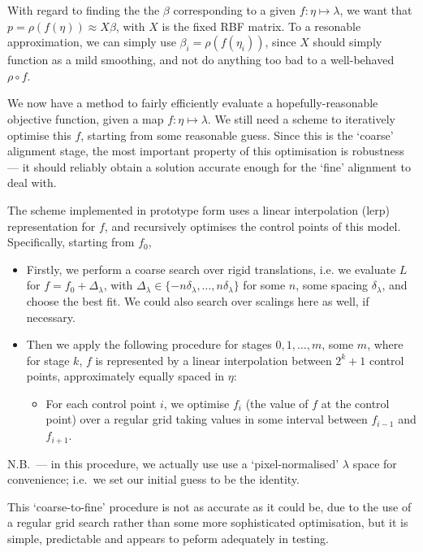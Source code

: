 With regard to finding the the $\beta$ corresponding to a given $f :
\eta \mapsto \lambda$, we want that $p = \rho (f (\eta)) \approx X
\beta$, with $X$ is the fixed RBF matrix. To a resonable approximation,
we can simply use $\beta_i= \rho (f (\eta_i))$, since $X$ should
simply function as a mild smoothing, and not do anything too bad to a
well-behaved $\rho \circ f$. 

We now have a method to fairly efficiently evaluate a
hopefully-reasonable objective function, given a map $f : \eta \mapsto
\lambda$. We still need a scheme to iteratively optimise this $f$,
starting from some reasonable guess. Since this is the `coarse'
alignment stage, the most important property of this optimisation is
robustness --- it should reliably obtain a solution accurate enough for
the `fine' alignment to deal with.

The scheme implemented in prototype form uses a linear interpolation (lerp)
representation for $f$, and recursively optimises the control points of this
model. Specifically, starting from $f_0$,
\begin{itemize}
\item Firstly, we perform a coarse search over rigid translations, i.e.
we evaluate $L$ for $f = f_0 + \Delta_\lambda$, with $\Delta_\lambda
\in \{-n \delta_\lambda, \dots , n \delta_\lambda\}$ for some $n$, some
spacing $\delta_\lambda$, and choose the best fit. We could also search
over scalings here as well, if necessary.
\item Then we apply the following procedure for stages $0,1,\dots,m$,
some $m$, where for stage $k$, $f$ is represented by a linear
interpolation between $2^k + 1$ control points, approximately equally
spaced in
$\eta$:
\begin{itemize}
\item For each control point $i$, we optimise $f_i$ (the value of $f$ at
the control point) over a regular grid taking values in some interval between $f_{i-1}$
and $f_{i+1}$.
\end{itemize}
\end{itemize}

N.B.\ --- in this procedure, we actually use use a `pixel-normalised'
$\lambda$ space for convenience; i.e.\ we set our initial guess to be the
identity.

This `coarse-to-fine' procedure is not as accurate as it could be, due
to the use of a regular grid search rather than some more sophisticated
optimisation, but it is simple, predictable and appears to peform
adequately in testing.

